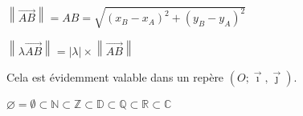 $\left\lVert \overrightarrow{AB} \right\rVert = AB = \sqrt{(x_B - x_A)^2 + (y_B - y_A)^2}$

\medskip

$\left\lVert \lambda \overrightarrow{AB}\right\rVert =
\left\lvert \lambda \right\rvert \times \left\lVert \overrightarrow{AB}\right\rVert$\par\medskip
Cela est évidemment valable dans un repère
$\left(O ; \overrightarrow\imath, \overrightarrow\jmath\right)$.\medskip

$\varnothing = \emptyset \subset \mathds N \subset \mathds Z \subset
\mathds D \subset \mathds Q\subset \mathds R \subset \mathds C$